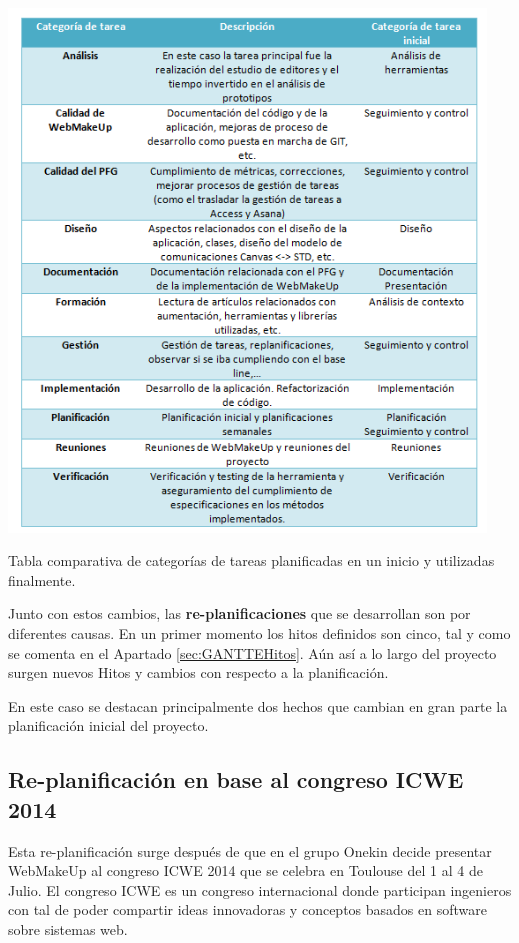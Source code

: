 \begin{table}
\begin{center}
\includegraphics[width=0.95\textwidth]{figs/6-RedistribucionTareas.png}
\end{center}
\caption{Tabla comparativa de categorías de tareas planificadas en un inicio y utilizadas finalmente.}
\label{tab:RedistribucionTareas}
\end{table}

Junto con estos cambios, las \textbf{re-planificaciones} que se desarrollan son por diferentes causas. En un primer momento los hitos definidos son cinco, tal y como se comenta en el Apartado \ref{sec:GANTTEHitos}. Aún así a lo largo del proyecto surgen nuevos Hitos y cambios con respecto a la planificación.

En este caso se destacan principalmente dos hechos que cambian en gran parte la planificación inicial del proyecto.

\subsection{Re-planificación en base al congreso ICWE 2014}
Esta re-planificación surge después de que en el grupo Onekin decide presentar WebMakeUp al congreso ICWE 2014 que se celebra en Toulouse del 1 al 4 de Julio. El congreso ICWE es un congreso internacional donde participan ingenieros con tal de poder compartir ideas innovadoras y conceptos basados en software sobre sistemas web.

